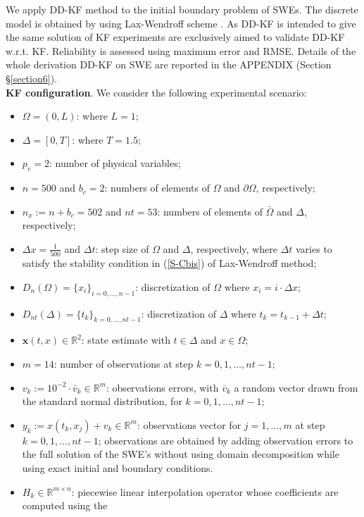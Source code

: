 \documentclass[smallcondensed]{svjour3}
\begin{document}
We apply DD-KF method to the initial boundary problem of SWEs. The discrete model is obtained  by using  Lax-Wendroff scheme \cite{LeVeque}. As DD-KF is intended to give the same solution of KF experiments are exclusively aimed to validate  DD-KF w.r.t. KF.  Reliability is assessed using maximum error and RMSE. Details of the whole derivation DD-KF on SWE are reported in the APPENDIX (Section \S \ref{section6}). \\

\noindent \textbf{KF configuration}. We consider the following experimental scenario:
\begin{itemize}
\item $\Omega=(0,L)$:   where $L=1$;
\item $\Delta=[0,T]$:   where $T=1.5$;
\item $p_v=2$: number of physical variables;
\item $n=500$ and $b_c=2$: numbers of elements of $\Omega$ and $\partial \Omega$, respectively; 
\item $n_{x}:=n+b_c=502$ and $nt=53$: numbers of elements of $\bar{\Omega}$ and $\Delta$, respectively;
\item $\Delta x=\frac{1}{500}$ and $\Delta t$: step size of $\Omega$ and $\Delta$, respectively, where $\Delta t$ varies to satisfy the stability condition in (\ref{S-Cbis}) of  Lax-Wendroff method;
\item $D_{n}({\Omega})=\{x_{i}\}_{i=0,\ldots,n-1}$: discretization of $\Omega$ where $x_{i}=i \cdot \Delta x$;
\item $D_{nt}({\Delta})=\{t_{k}\}_{k=0,\ldots,nt-1}$: discretization of $\Delta$ where $t_{k}=t_{k-1}+\Delta t$;
\item $\textbf{x}(t,x)\in \mathbb{R}^{2}$: state estimate with $t\in \Delta$ and $x\in \Omega$;
\item $m=14$:  number of observations at step $k=0,1,\ldots,nt-1$; 
\item $v_{k}:=10^{-2}\cdot \bar{v}_k\in \mathbb{R}^{m}$: observations errors, with $\bar{v}_k$ a random vector drawn from the standard normal distribution, for $k=0,1,\ldots,nt-1$;
\item $y_{k}:=x(t_{k},x_j)+v_{k}\in \mathbb{R}^{m}$: observations vector for $j=1,\ldots, m$ at  step $k=0,1,\ldots,nt-1$; observations are obtained by adding observation errors to the full solution of the SWE's without using domain decomposition while using exact initial and boundary conditions. 
\item $H_{k}\in \mathbb{R}^{m\times n}$: piecewise linear interpolation operator whose coefficients are computed using the

\end{itemize}
\end{document}
